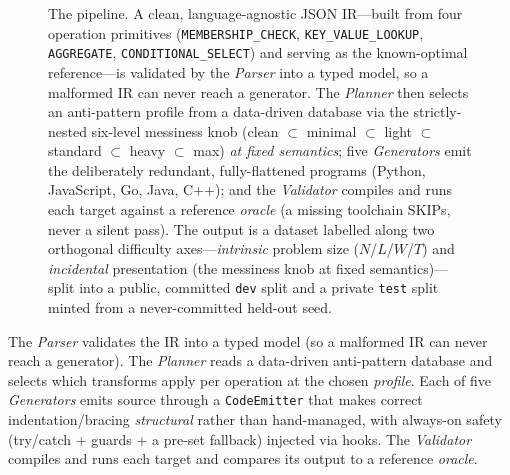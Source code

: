 \begin{figure}[t]
{%
}%
\caption{The \tool{} pipeline. A clean, language-agnostic JSON IR---built from four
operation primitives (\texttt{MEMBERSHIP\_CHECK}, \texttt{KEY\_VALUE\_LOOKUP},
\texttt{AGGREGATE}, \texttt{CONDITIONAL\_SELECT}) and serving as the known-optimal
reference---is validated by the \emph{Parser} into a typed model, so a malformed IR can
never reach a generator. The \emph{Planner} then selects an anti-pattern profile from a
data-driven database via the strictly-nested six-level messiness knob
(\textsf{clean} $\subset$ \textsf{minimal} $\subset$ \textsf{light} $\subset$ \textsf{standard} $\subset$ \textsf{heavy} $\subset$ \textsf{max})
\emph{at fixed semantics}; five \emph{Generators} emit the deliberately redundant,
fully-flattened programs (Python, JavaScript, Go, Java, C++); and the \emph{Validator}
compiles and runs each target against a reference \emph{oracle} (a missing toolchain
\textsf{SKIP}s, never a silent pass). The output is a dataset labelled along two
orthogonal difficulty axes---\emph{intrinsic} problem size ($N$/$L$/$W$/$T$) and
\emph{incidental} presentation (the messiness knob at fixed semantics)---split into a
public, committed \texttt{dev} split and a private \texttt{test} split minted from a
never-committed held-out seed.}
\label{fig:pipeline}
\end{figure}

The \emph{Parser} validates the IR into a typed model (so a malformed IR can never reach
a generator). The \emph{Planner} reads a data-driven anti-pattern database and selects
which transforms apply per operation at the chosen \emph{profile}. Each of five
\emph{Generators} emits source through a \texttt{CodeEmitter} that makes correct
indentation/bracing \emph{structural} rather than hand-managed, with always-on safety
(try/catch + guards + a pre-set fallback) injected via hooks. The \emph{Validator}
compiles and runs each target and compares its output to a reference \emph{oracle}.

